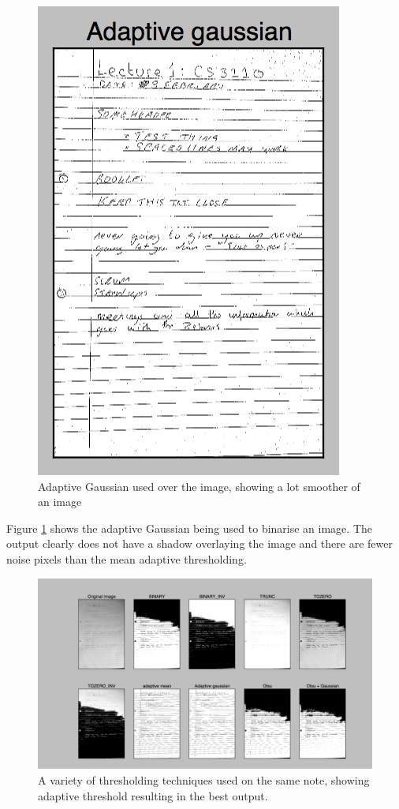 \begin{figure}[H]
  \centering
  \includegraphics{images/adaptive_gaussian}
  \caption{Adaptive Gaussian used over the image, showing a lot smoother of an image}
  \label{fig:adaptive_gaussian}
\end{figure}

Figure \ref{fig:adaptive_gaussian} shows the adaptive Gaussian being used to binarise an image. The output clearly does not have a shadow overlaying the image and there are fewer noise pixels than the mean adaptive thresholding.

\begin{figure}[H]
  \centering
  \includegraphics[scale=0.3]{images/thresholding_options}
  \caption{A variety of thresholding techniques used on the same note, showing adaptive threshold resulting in the best output.}
  \label{fig:thresholding_options}
\end{figure}

